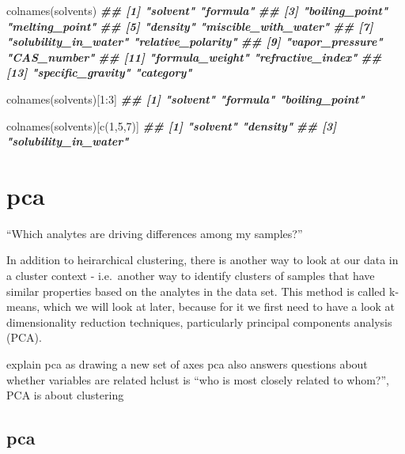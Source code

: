 \documentclass[
]{krantz}
\newenvironment{Shaded}{\begin{snugshade}}{\end{snugshade}}
\newcommand{\DecValTok}[1]{\textcolor[rgb]{0.00,0.00,0.81}{#1}}
\newcommand{\DocumentationTok}[1]{\textcolor[rgb]{0.56,0.35,0.01}{\textbf{\textit{#1}}}}
\newcommand{\FunctionTok}[1]{\textcolor[rgb]{0.00,0.00,0.00}{#1}}
\newcommand{\NormalTok}[1]{#1}
\newcommand{\SpecialCharTok}[1]{\textcolor[rgb]{0.00,0.00,0.00}{#1}}
\begin{document}
\begin{Shaded}
\begin{Highlighting}[]
\FunctionTok{colnames}\NormalTok{(solvents)}
\DocumentationTok{\#\#  [1] "solvent"             "formula"            }
\DocumentationTok{\#\#  [3] "boiling\_point"       "melting\_point"      }
\DocumentationTok{\#\#  [5] "density"             "miscible\_with\_water"}
\DocumentationTok{\#\#  [7] "solubility\_in\_water" "relative\_polarity"  }
\DocumentationTok{\#\#  [9] "vapor\_pressure"      "CAS\_number"         }
\DocumentationTok{\#\# [11] "formula\_weight"      "refractive\_index"   }
\DocumentationTok{\#\# [13] "specific\_gravity"    "category"}

\FunctionTok{colnames}\NormalTok{(solvents)[}\DecValTok{1}\SpecialCharTok{:}\DecValTok{3}\NormalTok{]}
\DocumentationTok{\#\# [1] "solvent"       "formula"       "boiling\_point"}

\FunctionTok{colnames}\NormalTok{(solvents)[}\FunctionTok{c}\NormalTok{(}\DecValTok{1}\NormalTok{,}\DecValTok{5}\NormalTok{,}\DecValTok{7}\NormalTok{)]}
\DocumentationTok{\#\# [1] "solvent"             "density"            }
\DocumentationTok{\#\# [3] "solubility\_in\_water"}
\end{Highlighting}
\end{Shaded}

\hypertarget{pca}{%
\section{pca}\label{pca}}

``Which analytes are driving differences among my samples?''

In addition to heirarchical clustering, there is another way to look at our data in a cluster context - i.e.~another way to identify clusters of samples that have similar properties based on the analytes in the data set. This method is called k-means, which we will look at later, because for it we first need to have a look at dimensionality reduction techniques, particularly principal components analysis (PCA).

explain pca as drawing a new set of axes
pca also answers questions about whether variables are related
hclust is ``who is most closely related to whom?'', PCA is about clustering

\hypertarget{pca-1}{%
\subsection{pca}\label{pca-1}}
\end{document}
